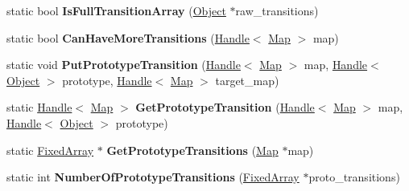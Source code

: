 \begin{DoxyCompactItemize}
\item 
static bool {\bfseries Is\+Full\+Transition\+Array} (\hyperlink{classv8_1_1internal_1_1_object}{Object} $\ast$raw\+\_\+transitions)\hypertarget{classv8_1_1internal_1_1_transition_array_a2985a9a6b4a1ad6495921b8ee1a6052b}{}\label{classv8_1_1internal_1_1_transition_array_a2985a9a6b4a1ad6495921b8ee1a6052b}

\item 
static bool {\bfseries Can\+Have\+More\+Transitions} (\hyperlink{classv8_1_1internal_1_1_handle}{Handle}$<$ \hyperlink{classv8_1_1internal_1_1_map}{Map} $>$ map)\hypertarget{classv8_1_1internal_1_1_transition_array_a11cf3c7f361fb46a92f7853667c06bf0}{}\label{classv8_1_1internal_1_1_transition_array_a11cf3c7f361fb46a92f7853667c06bf0}

\item 
static void {\bfseries Put\+Prototype\+Transition} (\hyperlink{classv8_1_1internal_1_1_handle}{Handle}$<$ \hyperlink{classv8_1_1internal_1_1_map}{Map} $>$ map, \hyperlink{classv8_1_1internal_1_1_handle}{Handle}$<$ \hyperlink{classv8_1_1internal_1_1_object}{Object} $>$ prototype, \hyperlink{classv8_1_1internal_1_1_handle}{Handle}$<$ \hyperlink{classv8_1_1internal_1_1_map}{Map} $>$ target\+\_\+map)\hypertarget{classv8_1_1internal_1_1_transition_array_a30fd943b2ffb53464fe0e1da0e7623c0}{}\label{classv8_1_1internal_1_1_transition_array_a30fd943b2ffb53464fe0e1da0e7623c0}

\item 
static \hyperlink{classv8_1_1internal_1_1_handle}{Handle}$<$ \hyperlink{classv8_1_1internal_1_1_map}{Map} $>$ {\bfseries Get\+Prototype\+Transition} (\hyperlink{classv8_1_1internal_1_1_handle}{Handle}$<$ \hyperlink{classv8_1_1internal_1_1_map}{Map} $>$ map, \hyperlink{classv8_1_1internal_1_1_handle}{Handle}$<$ \hyperlink{classv8_1_1internal_1_1_object}{Object} $>$ prototype)\hypertarget{classv8_1_1internal_1_1_transition_array_a5dbdfc31ddc127c63a691dc308876d11}{}\label{classv8_1_1internal_1_1_transition_array_a5dbdfc31ddc127c63a691dc308876d11}

\item 
static \hyperlink{classv8_1_1internal_1_1_fixed_array}{Fixed\+Array} $\ast$ {\bfseries Get\+Prototype\+Transitions} (\hyperlink{classv8_1_1internal_1_1_map}{Map} $\ast$map)\hypertarget{classv8_1_1internal_1_1_transition_array_a5dba0e7b61fd67421e3f5f3f5d2ffaee}{}\label{classv8_1_1internal_1_1_transition_array_a5dba0e7b61fd67421e3f5f3f5d2ffaee}

\item 
static int {\bfseries Number\+Of\+Prototype\+Transitions} (\hyperlink{classv8_1_1internal_1_1_fixed_array}{Fixed\+Array} $\ast$proto\+\_\+transitions)\hypertarget{classv8_1_1internal_1_1_transition_array_a0f7fea3230f4a97c241a03da0cab1d9f}{}\label{classv8_1_1internal_1_1_transition_array_a0f7fea3230f4a97c241a03da0cab1d9f}


\end{DoxyCompactItemize}
